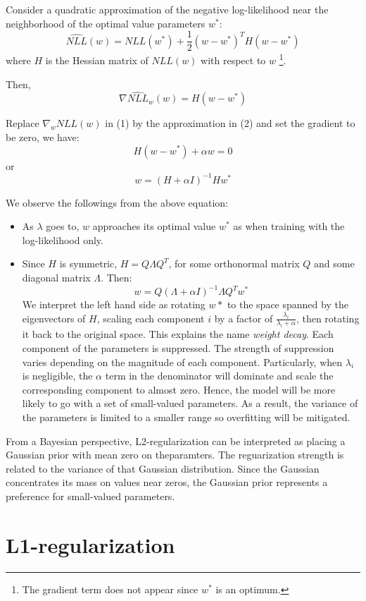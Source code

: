 \documentclass[11pt,letterpaper]{article}
\begin{document}
Consider a quadratic approximation of the negative log-likelihood near the neighborhood of the optimal value parameters $w^*$:
$$ \hat{NLL}(w) = NLL(w^*) + \frac{1}{2}(w - w^*)^T H(w - w^*)$$ where $H$ is the Hessian matrix of $NLL(w)$ with respect to $w$ \footnote{The gradient term does not appear since $w^*$ is an optimum.}.

Then, 
\begin{equation}
\nabla \hat{NLL}_w(w) = H(w - w^*)
\end{equation}

Replace $\nabla_w NLL(w)$ in (1) by the approximation in (2) and set the gradient to be zero, we have:
$$ H(w - w^*) + \alpha w = 0$$
or
$$
w = (H + \alpha I)^{-1}Hw^*
$$

We observe the followings from the above equation:
\begin{itemize}
\item As $\lambda$ goes to, $w$ approaches its optimal value $w^*$ as when training with the log-likelihood only. 

\item Since $H$ is symmetric, $H = Q \Lambda Q^T$, for some orthonormal matrix $Q$ and some diagonal matrix $\Lambda$. Then:
$$ w = Q(\Lambda + \alpha I)^{-1} \Lambda Q^T w^*$$
We interpret the left hand side as rotating $w*$ to the space spanned by the eigenvectors of $H$, scaling each component $i$ by a factor of $\frac{\lambda_i}{\lambda _i + \alpha}$, then rotating it back to the original space. This explains the name \emph{weight decay}. Each component of the parameters is suppressed. The strength of suppression varies depending on the magnitude of each component. Particularly, when $\lambda_i$ is negligible, the $\alpha$ term in the denominator will dominate and scale the  corresponding component to almost zero. Hence, the model will be more likely to go with a set of small-valued parameters. As a result, the variance of the parameters is limited to a smaller range so overfitting will be mitigated.


\end{itemize}


From a Bayesian perspective, L2-regularization can be interpreted as placing a Gaussian prior with mean zero on theparamters. The reguarization strength is related to the variance of that Gaussian distribution. Since the Gaussian concentrates its mass on values near zeros, the Gaussian prior represents a preference for small-valued parameters.  
\section{L1-regularization}
\end{document}
